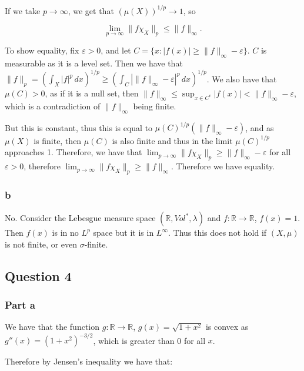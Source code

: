 \documentclass{article}
\theoremstyle{definition}
\numberwithin{theorem}{section}
\numberwithin{equation}{section}
\begin{document}
If we take $p \rightarrow \infty$, we get that $(\mu(X))^{1/p} \rightarrow 1$, so 

\begin{equation}
	\lim_{p \rightarrow \infty} \| f \chi_X \|_p \leq \|f \|_{\infty}.
\end{equation}

To show equality, fix $\varepsilon > 0$, and let $C = \lbrace x : |f(x)| \geq \| f \|_{\infty} - \varepsilon \rbrace$. $C$ is measurable as it is a level set. Then we have that $ \|f \|_p = \left(\int_X |f|^p \, dx \right)^{1/p} \geq \left(\int_C |\| f \|_{\infty} - \varepsilon|^p \, dx \right)^{1/p}$. We also have that $\mu(C) > 0$, as if it is a null set, then $\|f \|_{\infty} \leq \sup_{x \in C^c} |f(x)| < \|f\|_{\infty} - \varepsilon$, which is a contradiction of $\|f \|_{\infty}$ being finite. 

But this is constant, thus this is equal to $\mu(C)^{1/p}( \| f \|_{\infty} - \varepsilon)$, and as $\mu(X)$ is finite, then $\mu(C)$ is also finite and thus in the limit $\mu(C)^{1/p}$ approaches 1. Therefore, we have that $\lim_{p \rightarrow \infty} \| f \chi_X \|_p \geq \|f \|_{\infty} - \varepsilon$ for all $\varepsilon > 0$, therefore $\lim_{p \rightarrow \infty} \| f \chi_X \|_p \geq \|f \|_{\infty}$. Therefore we have equality.
\subsubsection*{b}
No. Consider the Lebesgue measure space $(\mathbb{R}, Vol^*, \lambda)$ and $f : \mathbb{R} \rightarrow \mathbb{R}$, $f(x) = 1$. Then $f(x)$ is in no $L^p$ space but it is in $L^\infty$. Thus this does not hold if $(X, \mu)$ is not finite, or even $\sigma$-finite. 
\subsection*{Question 4}
\subsubsection*{Part a}
We have that the function $g: \mathbb{R} \rightarrow \mathbb{R}$, $g(x) = \sqrt{1 + x^2}$ is convex as $g''(x) = (1 + x^2)^{-3/2}$, which is greater than 0 for all $x$. 

Therefore by Jensen's inequality we have that:
\end{document}
